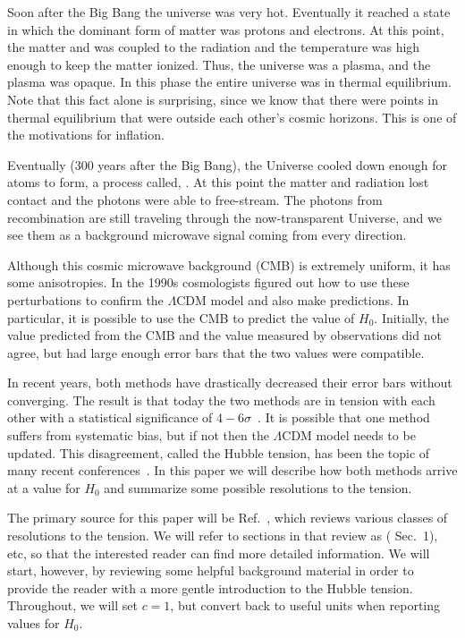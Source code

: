 \documentclass[12pt]{article}
\renewcommand{\L}{$\Lambda$}
\newcommand{\val}[1]{\cite{DiValentino2021} Sec.~#1}
\begin{document}
Soon after the Big Bang the universe was very hot. Eventually it reached a state in which the dominant form of matter was protons and electrons. At this point, the matter and was coupled to the radiation and the temperature was high enough to keep the matter ionized. Thus, the universe was a plasma, and the plasma was opaque.
In this phase the entire universe was in thermal equilibrium. Note that this fact alone is surprising, since we know that there were points in thermal equilibrium that were outside each other's cosmic horizons. This is one of the motivations for inflation. 

Eventually (300 years after the Big Bang), the Universe cooled down enough for atoms to form, a process called, . At this point the matter and radiation lost contact and the photons were able to free-stream. The photons from recombination are still traveling through the now-transparent Universe, and we see them as a background microwave signal coming from every direction.

Although this cosmic microwave background (CMB) is extremely uniform, it has some anisotropies. In the 1990s cosmologists figured out how to use these perturbations to confirm the \L CDM model and also make predictions. In particular, it is possible to use the CMB to predict the value of $H_0$. Initially, the value predicted from the CMB and the value measured by observations did not agree, but had large enough error bars that the two values were compatible. 

In recent years, both methods have drastically decreased their error bars without converging. The result is that today the two methods are in tension with each other with a statistical significance of $4-6\sigma$~\cite{DiValentino2021}. It is possible that one method suffers from systematic bias, but if not then the \L CDM model needs to be updated. This disagreement, called the Hubble tension, has been the topic of many recent conferences~\cite{Verde2019, DiValentino2020}.  In this paper we will describe how both methods arrive at a value for $H_0$ and summarize some possible resolutions to the tension.

The primary source for this paper will be Ref.~\cite{DiValentino2021}, which reviews various classes of resolutions to the tension. We will refer to sections in that review as (\val{1}), etc, so that the interested reader can find more detailed information. We will start, however, by reviewing some helpful background material in order to provide the reader with a more gentle introduction to the Hubble tension. Throughout, we will set $c = 1$, but convert back to useful units when reporting values for $H_0$.
\end{document}
